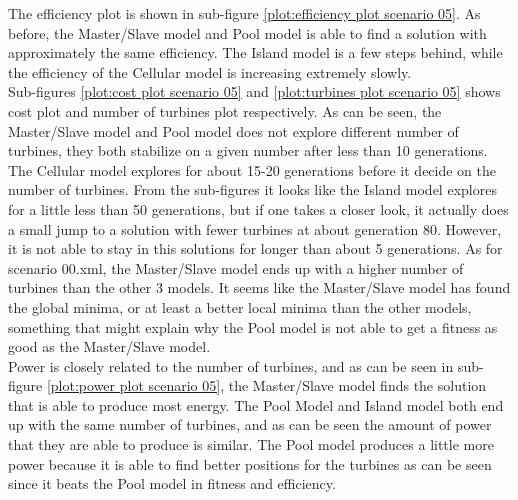\noindent The efficiency plot is shown in sub-figure \ref{plot:efficiency plot scenario 05}. As before, the Master/Slave model and Pool model is able to find a solution with approximately the same efficiency. The Island model is a few steps behind, while the efficiency of the Cellular model is increasing extremely slowly. \\


\noindent Sub-figures \ref{plot:cost plot scenario 05} and \ref{plot:turbines plot scenario 05} shows cost plot and number of turbines plot respectively. As can be seen, the Master/Slave model and Pool model does not explore different number of turbines, they both stabilize on a given number after less than 10 generations. The Cellular model explores for about 15-20 generations before it decide on the number of turbines. From the sub-figures it looks like the Island model explores for a little less than 50 generations, but if one takes a closer look, it actually does a small jump to a solution with fewer turbines at about generation 80. However, it is not able to stay in this solutions for longer than about 5 generations. As for scenario 00.xml, the Master/Slave model ends up with a higher number of turbines than the other 3 models. It seems like the Master/Slave model has found the global minima, or at least a better local minima than the other models, something that might explain why the Pool model is not able to get a fitness as good as the Master/Slave model.\\


\noindent Power is closely related to the number of turbines, and as can be seen in sub-figure \ref{plot:power plot scenario 05}, the Master/Slave model finds the solution that is able to produce most energy. The Pool Model and Island model both end up with the same number of turbines, and as can be seen the amount of power that they are able to produce is similar. The Pool model produces a little more power because it is able to find better positions for the turbines as can be seen since it beats the Pool model in fitness and efficiency. \\


